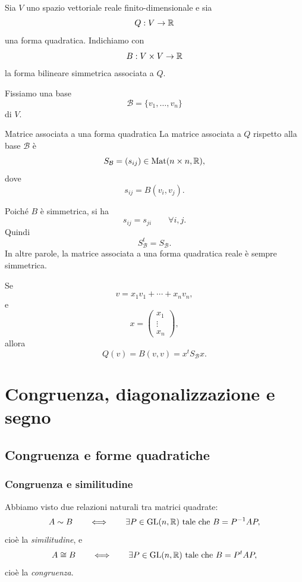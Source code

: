 \documentclass[a4paper]{article}
\begin{document}
Sia \(V\) uno spazio vettoriale reale finito-dimensionale e sia
\[
    Q:V\to\mathbb{R}
\]
una forma quadratica. Indichiamo con
\[
    B:V\times V\to\mathbb{R}
\]
la forma bilineare simmetrica associata a \(Q\).

Fissiamo una base
\[
    \mathcal{B}=\{v_1,\ldots,v_n\}
\]
di \(V\).

\begin{snippetdefinition}{Matrice associata a una forma quadratica}
    La matrice associata a \(Q\) rispetto alla base \(\mathcal{B}\) è
    \[
        S_{\mathcal{B}}=(s_{ij})\in\operatorname{Mat}(n\times n,\mathbb{R}),
    \]
    dove
    \[
        s_{ij}=B(v_i,v_j).
    \]
\end{snippetdefinition}

Poiché \(B\) è simmetrica, si ha
\[
    s_{ij}=s_{ji}
    \qquad
    \forall i,j.
\]
Quindi
\[
    S_{\mathcal{B}}^t=S_{\mathcal{B}}.
\]
In altre parole, la matrice associata a una forma quadratica reale è sempre simmetrica.

Se
\[
    v=x_1v_1+\cdots+x_nv_n,
\]
e
\[
    x=
    \begin{pmatrix}
        x_1\\
        \vdots\\
        x_n
    \end{pmatrix},
\]
allora
\[
    Q(v)=B(v,v)=x^tS_{\mathcal{B}}x.
\]

\section{Congruenza, diagonalizzazione e segno}

\subsection{Congruenza e forme quadratiche}

\subsubsection{Congruenza e similitudine}

Abbiamo visto due relazioni naturali tra matrici quadrate:
\[
    A\sim B
    \qquad
    \Longleftrightarrow
    \qquad
    \exists P\in\operatorname{GL}(n,\mathbb{R})
    \text{ tale che }
    B=P^{-1}AP,
\]
cioè la \emph{similitudine}, e
\[
    A\cong B
    \qquad
    \Longleftrightarrow
    \qquad
    \exists P\in\operatorname{GL}(n,\mathbb{R})
    \text{ tale che }
    B=P^tAP,
\]
cioè la \emph{congruenza}.
\end{document}
